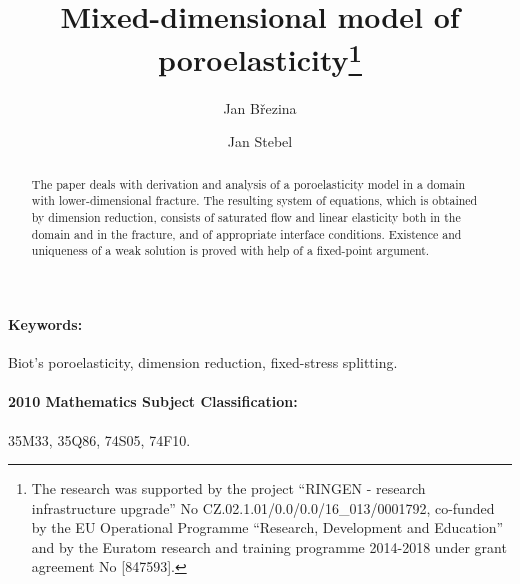 \documentclass[a4paper]{article}
\numberwithin{equation}{section}
\begin{document}
\title{Mixed-dimensional model of poroelasticity\thanks{The research was supported by the project ``RINGEN - research infrastructure upgrade'' No CZ.02.1.01/0.0/0.0/16\_013/0001792, co-funded by the EU Operational Programme ``Research, Development and Education'' and by the Euratom research and training programme 2014-2018 under grant agreement No [847593].}}
\author{Jan Březina}
\author{Jan Stebel}
\maketitle

\begin{abstract}
The paper deals with derivation and analysis of a poroelasticity model in a domain with lower-dimensional fracture.
The resulting system of equations, which is obtained by dimension reduction, consists of saturated flow and linear elasticity both in the domain and in the fracture, and of appropriate interface conditions.
Existence and uniqueness of a weak solution is proved with help of a fixed-point argument.
\end{abstract}

\paragraph{Keywords:}
Biot's poroelasticity, dimension reduction, fixed-stress splitting.

\paragraph{2010 Mathematics Subject Classification:}
35M33, %
35Q86, %
74S05, %
74F10. %
\end{document}
